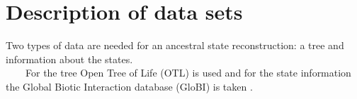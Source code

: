   \section{Description of data sets}
    Two types of data are needed for an ancestral state reconstruction: a tree and information about 
      the states. \\
    For the tree Open Tree of Life (OTL) is used \cite{Hinchliff2015} and for the state information 
      the Global Biotic Interaction database (GloBI) is taken \cite{Poelen2014}. \\

